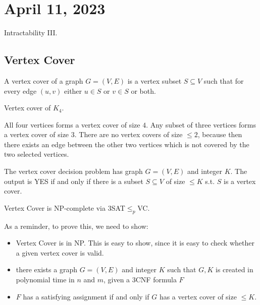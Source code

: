 \section{April 11, 2023}

Intractability III. 

\subsection{Vertex Cover}

\begin{definition}

A \ac{vertex cover} of a graph $G=(V,E)$ is a vertex subset $S\subseteq V$ such that for every edge $(u,v)$ either $u\in S$ or $v\in S$ or both. 
\end{definition}

\begin{example}
\exlabel

Vertex cover of $K_4$. 
\end{example}

All four vertices forms a vertex cover of size $4$. Any subset of three vertices forms a vertex cover of size $3$. There are no vertex covers of size $\leq 2$, because then there exists an edge between the other two vertices which is not covered by the two selected vertices. 

The vertex cover decision problem has graph $G=(V,E)$ and integer $K$. The output is YES if and only if there is a subset $S\subseteq V$ of size $\leq K$ s.t. $S$ is a vertex cover. 

\begin{theorem}
\thmlabel

Vertex Cover is NP-complete via $3$SAT$\leq_p$VC. 
\end{theorem}

As a reminder, to prove this, we need to show:
\begin{itemize}
    \item Vertex Cover is in NP. This is easy to show, since it is easy to check whether a given vertex cover is valid. 
    \item there exists a graph $G=(V,E)$ and integer $K$ such that $G,K$ is created in polynomial time in $n$ and $m$, given a $3$CNF formula $F$
    \item $F$ has a satisfying assignment if and only if $G$ has a vertex cover of size $\leq K$. 
\end{itemize}

